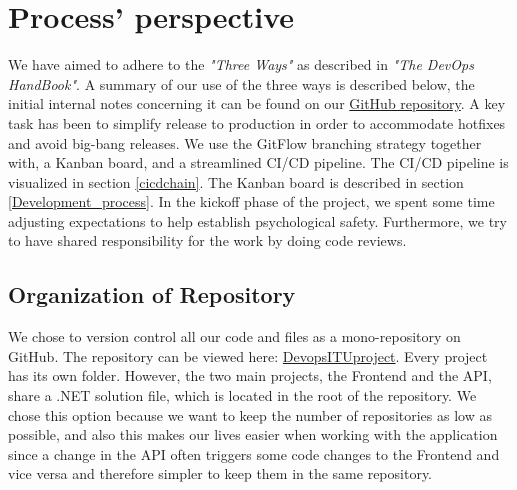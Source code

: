 \documentclass[10pt]{article}
\begin{document}
\section{Process' perspective}
We have aimed to adhere to the \textit{"Three Ways"} as described in \textit{"The DevOps HandBook"}\cite{kim2021devops}. A summary of our use of the three ways is described below, the initial internal notes concerning it can be found on our \href{https://github.com/Arklaide/devopsITUproject/blob/main/report/sub-reports/ThreeWays.md}{GitHub repository}.
A key task has been to simplify release to production in order to accommodate hotfixes and avoid big-bang releases. We use the GitFlow branching strategy together with, a Kanban board, and a streamlined CI/CD pipeline. The CI/CD pipeline is visualized in section \ref{cicdchain}. The Kanban board is described in section \ref{Development_process}. In the kickoff phase of the project, we spent some time adjusting expectations to help establish psychological safety. Furthermore, we try to have shared responsibility for the work by doing code reviews.

\subsection{Organization of Repository}
We chose to version control all our code and files as a mono-repository on GitHub. The repository can be viewed here: \href{https://github.com/Arklaide/devopsITUproject}{DevopsITUproject}.
Every project has its own folder. However, the two main projects, the Frontend and the API, share a .NET solution file, which is located in the root of the repository.
We chose this option because we want to keep the number of repositories as low as possible, and also this makes our lives easier when working with the application since a change in the API often triggers some code changes to the Frontend and vice versa and therefore simpler to keep them in the same repository.
\end{document}
